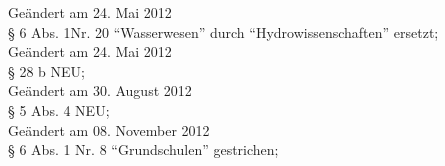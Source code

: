 Geändert am 24. Mai 2012\\
§ 6 Abs. 1Nr. 20 "`Wasserwesen"' durch "`Hydrowissenschaften"' ersetzt; \\

Geändert am 24. Mai 2012\\
§ 28 b NEU; \\

Geändert am 30. August 2012\\
§ 5 Abs. 4 NEU; \\

Geändert am 08. November 2012\\
§ 6 Abs. 1 Nr. 8 "`Grundschulen"' gestrichen; \\

\normalsize
